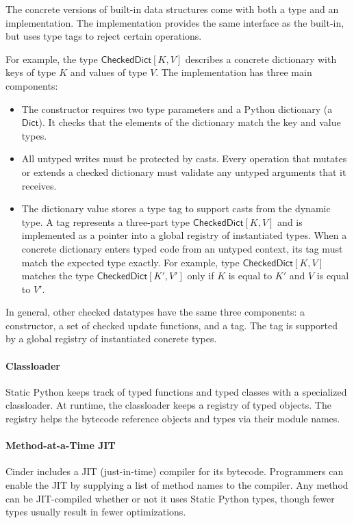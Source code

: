 \documentclass[english,cleveref,crc]{programming}
\newcommand{\SP}{Static Python}
\newcommand{\typefont}[1]{\mathsf{#1}}
\newcommand{\paramtype}[2]{#1[#2]}
\newcommand{\sptrawpydict}{\typefont{Dict}}
\newcommand{\sptrawchkdict}{\typefont{CheckedDict}} %
\newcommand{\sptchkdict}[2]{\paramtype{\sptrawchkdict}{#1, #2}}
\begin{document}
The concrete versions of built-in data structures come with both a type and an
implementation.
The implementation provides the same interface as the built-in, but uses
type tags to reject certain operations.

For example, the type $\sptchkdict{K}{V}$ describes a concrete dictionary
with keys of type $K$ and values of type $V$.
The implementation has three main components:
\begin{itemize}
  \item
    The constructor requires two type parameters and a Python dictionary (a $\sptrawpydict$).
    It checks that the elements of the dictionary match the key and value types.
  \item
    All untyped writes must be protected by casts.
    Every operation that mutates or extends a checked dictionary must
    validate any untyped arguments that it receives.
  \item
    The dictionary value stores a type tag to support casts from the dynamic
    type.
    A tag represents a three-part type $\sptchkdict{K}{V}$ and is implemented
    as a pointer into a global registry of instantiated types.
    When a concrete dictionary enters typed code from an untyped context,
    its tag must match the expected type exactly.
    For example, type $\sptchkdict{K}{V}$ matches the type
    $\sptchkdict{K'}{V'}$ only if $K$ is equal to $K'$
    and $V$ is equal to $V'$.
\end{itemize}
%
In general, other checked datatypes have the same three components:
a constructor, a set of checked update functions, and a tag.
The tag is supported by a global registry of instantiated concrete types.


\paragraph{Classloader}
\label{s:classloader}

\SP{} keeps track of typed functions and typed classes with a specialized classloader.
At runtime, the classloader keeps a registry of typed objects.
The registry helps the bytecode reference objects and types via their module names.


\paragraph{Method-at-a-Time JIT}
\label{s:jit}

Cinder includes a JIT (just-in-time) compiler for its bytecode.
Programmers can enable the JIT by supplying a list of method names
to the compiler.
Any method can be JIT-compiled whether or not it uses \SP{} types,
though fewer types usually result in fewer optimizations.
\end{document}

